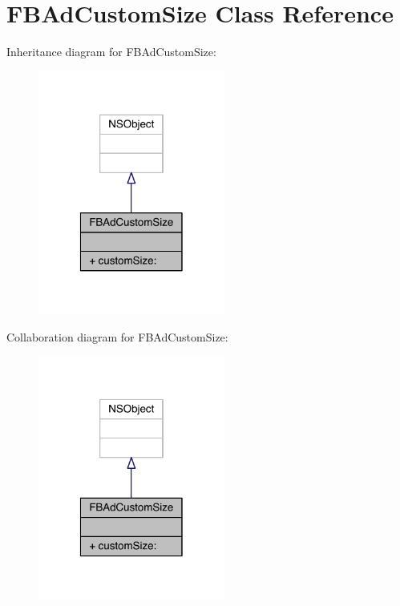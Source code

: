 \hypertarget{interface_f_b_ad_custom_size}{\section{F\-B\-Ad\-Custom\-Size Class Reference}
\label{interface_f_b_ad_custom_size}
}


Inheritance diagram for F\-B\-Ad\-Custom\-Size\-:
\nopagebreak
\begin{figure}[H]
\begin{center}
\leavevmode
\includegraphics[width=174pt]{interface_f_b_ad_custom_size__inherit__graph}
\end{center}
\end{figure}


Collaboration diagram for F\-B\-Ad\-Custom\-Size\-:
\nopagebreak
\begin{figure}[H]
\begin{center}
\leavevmode
\includegraphics[width=174pt]{interface_f_b_ad_custom_size__coll__graph}
\end{center}
\end{figure}
